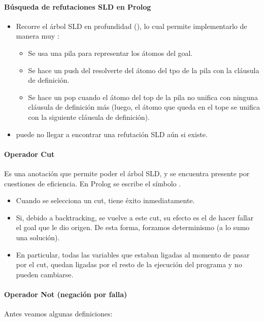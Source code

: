 \paragraph{Búsqueda de refutaciones SLD en Prolog}
\begin{itemize}
  \item Recorre el árbol SLD en profundidad (), lo cual permite implementarlo de manera muy :
  \begin{itemize}
    \item Se usa una pila para representar los átomos del goal.
    \item Se hace un push del resolverte del átomo del tpo de la pila con la cláusula de definición.
    \item Se hace un pop cuando el átomo del top de la pila no unifica con ninguna cláusula de definición más (luego, el átomo que queda en el tope se unifica con la siguiente cláusula de definición).
  \end{itemize}
  \item {} puede no llegar a encontrar una refutación SLD aún si existe.
\end{itemize}

\paragraph{Operador Cut}

Es una anotación que permite poder el árbol SLD, y se encuentra presente por cuestiones de eficiencia. En Prolog se escribe el símbolo \xtt{!}.

\begin{itemize}
  \item Cuando se selecciona un cut, tiene éxito inmediatamente.
  \item Si, debido a backtracking, se vuelve a este cut, su efecto es el de hacer fallar el goal que le dio origen. De esta forma, forzamos determinismo (a lo sumo una solución).
  \item En particular, todas las variables que estaban ligadas al momento de pasar por el cut, quedan ligadas por el resto de la ejecución del programa y no pueden cambiarse.
\end{itemize}

\paragraph{Operador Not (negación por falla)}

Antes veamos algunas definiciones:

